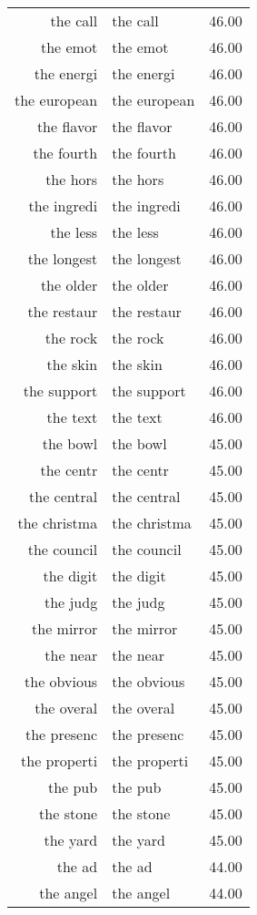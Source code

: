 \begin{table}[ht]
\begin{tabular}{rlr}
  the call & the call & 46.00 \\ 
  the emot & the emot & 46.00 \\ 
  the energi & the energi & 46.00 \\ 
  the european & the european & 46.00 \\ 
  the flavor & the flavor & 46.00 \\ 
  the fourth & the fourth & 46.00 \\ 
  the hors & the hors & 46.00 \\ 
  the ingredi & the ingredi & 46.00 \\ 
  the less & the less & 46.00 \\ 
  the longest & the longest & 46.00 \\ 
  the older & the older & 46.00 \\ 
  the restaur & the restaur & 46.00 \\ 
  the rock & the rock & 46.00 \\ 
  the skin & the skin & 46.00 \\ 
  the support & the support & 46.00 \\ 
  the text & the text & 46.00 \\ 
  the bowl & the bowl & 45.00 \\ 
  the centr & the centr & 45.00 \\ 
  the central & the central & 45.00 \\ 
  the christma & the christma & 45.00 \\ 
  the council & the council & 45.00 \\ 
  the digit & the digit & 45.00 \\ 
  the judg & the judg & 45.00 \\ 
  the mirror & the mirror & 45.00 \\ 
  the near & the near & 45.00 \\ 
  the obvious & the obvious & 45.00 \\ 
  the overal & the overal & 45.00 \\ 
  the presenc & the presenc & 45.00 \\ 
  the properti & the properti & 45.00 \\ 
  the pub & the pub & 45.00 \\ 
  the stone & the stone & 45.00 \\ 
  the yard & the yard & 45.00 \\ 
  the ad & the ad & 44.00 \\ 
  the angel & the angel & 44.00 \\ 

\end{tabular}
\end{table}
